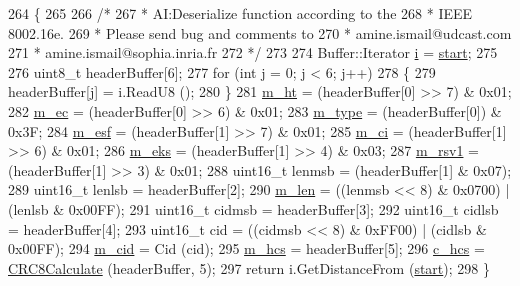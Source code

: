 \begin{DoxyCode}
264 \{
265 
266   \textcolor{comment}{/*}
267 \textcolor{comment}{   * AI:Deserialize function according to the}
268 \textcolor{comment}{   * IEEE 8002.16e.}
269 \textcolor{comment}{   * Please send bug and comments to}
270 \textcolor{comment}{   * amine.ismail@udcast.com}
271 \textcolor{comment}{   * amine.ismail@sophia.inria.fr}
272 \textcolor{comment}{   */}
273 
274   Buffer::Iterator \hyperlink{bernuolliDistribution_8m_a6f6ccfcf58b31cb6412107d9d5281426}{i} = \hyperlink{namespacevisualizer_1_1core_a2a35e5d8a34af358b508dac8635754e0}{start};
275 
276   uint8\_t headerBuffer[6];
277   \textcolor{keywordflow}{for} (\textcolor{keywordtype}{int} j = 0; j < 6; j++)
278     \{
279       headerBuffer[j] = i.ReadU8 ();
280     \}
281   \hyperlink{classns3_1_1GenericMacHeader_a35c4cce15809ec8472e236d4595693b0}{m\_ht} = (headerBuffer[0] >> 7) & 0x01;
282   \hyperlink{classns3_1_1GenericMacHeader_a926fba749a72e5069afb7dfe0d9b565a}{m\_ec} = (headerBuffer[0] >> 6) & 0x01;
283   \hyperlink{classns3_1_1GenericMacHeader_ad117be226baa0fd1757cdba611016844}{m\_type} = (headerBuffer[0]) & 0x3F;
284   \hyperlink{classns3_1_1GenericMacHeader_a8326410f7581488e9ad38660fce99eeb}{m\_esf} = (headerBuffer[1] >> 7) & 0x01;
285   \hyperlink{classns3_1_1GenericMacHeader_ac963f44cb95647ccba2d650005f8ed60}{m\_ci} = (headerBuffer[1] >> 6) & 0x01;
286   \hyperlink{classns3_1_1GenericMacHeader_afd010ab0a6858a4b354fbe375f9a28a8}{m\_eks} = (headerBuffer[1] >> 4) & 0x03;
287   \hyperlink{classns3_1_1GenericMacHeader_a4a38605264c8e8c6f3e7f28f772f5308}{m\_rsv1} = (headerBuffer[1] >> 3) & 0x01;
288   uint16\_t lenmsb = (headerBuffer[1] & 0x07);
289   uint16\_t lenlsb = headerBuffer[2];
290   \hyperlink{classns3_1_1GenericMacHeader_a654e7aa3e36a5d055e72ffee0907ce46}{m\_len} = ((lenmsb << 8) & 0x0700) | (lenlsb & 0x00FF);
291   uint16\_t cidmsb = headerBuffer[3];
292   uint16\_t cidlsb = headerBuffer[4];
293   uint16\_t cid = ((cidmsb << 8) & 0xFF00) | (cidlsb & 0x00FF);
294   \hyperlink{classns3_1_1GenericMacHeader_aaef3e7fcc428b7efb07fff44159f5606}{m\_cid} = Cid (cid);
295   \hyperlink{classns3_1_1GenericMacHeader_a1fd241718b50431acfdba2310dff52d1}{m\_hcs} = headerBuffer[5];
296   \hyperlink{classns3_1_1GenericMacHeader_aeef38ec340d4a5d1a28a52aca4c3341b}{c\_hcs} = \hyperlink{namespacens3_a5329c9897a8f3f61ec901c9d1e61613a}{CRC8Calculate} (headerBuffer, 5);
297   \textcolor{keywordflow}{return} i.GetDistanceFrom (\hyperlink{namespacevisualizer_1_1core_a2a35e5d8a34af358b508dac8635754e0}{start});
298 \}
\end{DoxyCode}


